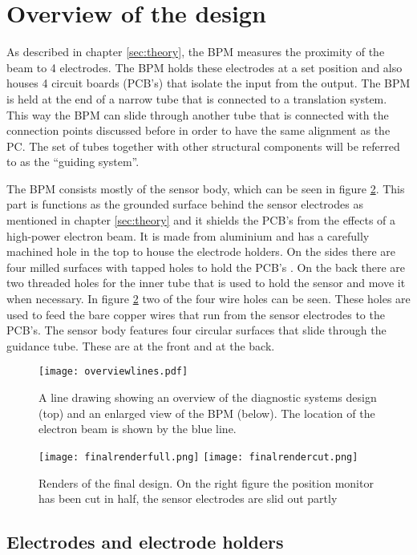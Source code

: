 \section{Overview of the design}
As described in chapter \ref{sec:theory}, the BPM measures the proximity of the beam to 4 electrodes. The BPM holds these electrodes at a set position and also houses 4 circuit boards (PCB's) that isolate the input from the output. The BPM is held at the end of a narrow tube that is connected to a translation system. This way the BPM can slide through another tube that is connected with the connection points discussed before in order to have the same alignment as the PC. The set of tubes together with other structural components will be referred to as the ``guiding system''.

The BPM consists mostly of the sensor body, which can be seen in figure \ref{fig:designfinal}. This part is functions as the grounded surface behind the sensor electrodes as mentioned in chapter \ref{sec:theory} and it shields the PCB's from the effects of a high-power electron beam.
It is made from aluminium and has a carefully machined hole in the top to house the electrode holders. On the sides there are four milled surfaces with tapped holes to hold the PCB's . On the back there are two threaded holes for the inner tube that is used to hold the sensor and move it when necessary. 
In figure \ref{fig:designfinal} two of the four wire holes can be seen. These holes are used to feed the bare copper wires that run from the sensor electrodes to the PCB's.
The sensor body features four circular surfaces that slide through the guidance tube. These are at the front and at the back.

\begin{figure}[h]
 \centering
 \texttt{[image: overviewlines.pdf]}
 \caption{A line drawing showing an overview of the diagnostic systems design (top) and an enlarged view of the BPM (below). The location of the electron beam is shown by the blue line.}
 \label{fig:designoverview}
\end{figure}

\begin{figure}[h]
  \centering
  \texttt{[image: finalrenderfull.png]}
  \texttt{[image: finalrendercut.png]}
  \caption{Renders of the final design. On the right figure the position monitor has been cut in half, the sensor electrodes are slid out partly}
  \label{fig:designfinal}
\end{figure}
\newpage
\subsection{Electrodes and electrode holders}

